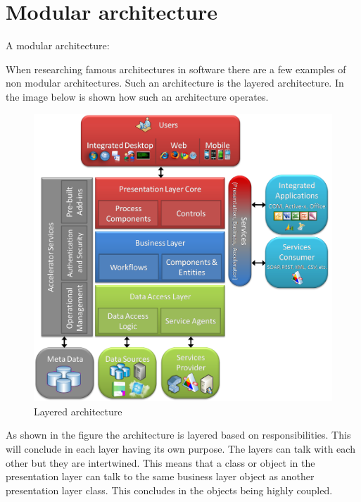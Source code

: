 \chapter{Modular architecture}
\label{sec:ModularArchitecture}

A modular architecture:

When researching famous architectures in software there are a few examples of non modular architectures. Such an architecture is the layered architecture. In the image below is shown how such an architecture operates.

\begin{figure}[H]
	\includegraphics[width=\linewidth]{layered_architecture.png}
	\caption{Layered architecture \cite{layeredArchitecture}}
\end{figure}

As shown in the figure the architecture is layered based on responsibilities. This will conclude in each layer having its own purpose. The layers can talk with each other but they are intertwined. This means that a class or object in the presentation layer can talk to the same business layer object as another presentation layer class. This concludes in the objects being highly coupled.

